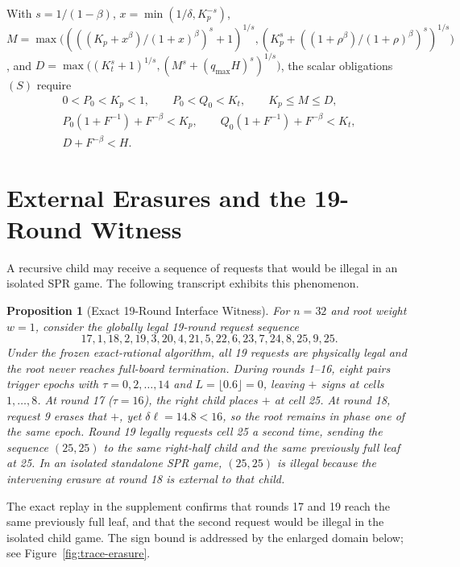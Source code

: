 \documentclass[11pt,letterpaper]{article}
\newtheorem{proposition}[theorem]{Proposition}
\theoremstyle{definition}
\theoremstyle{remark}
\begin{document}
With $s = 1/(1-\beta)$, $x = \min(1/\delta, K_p^{-s})$, $M = \max\bigl((((K_p+x^\beta)/(1+x)^\beta)^s+1)^{1/s}, (K_p^s + ((1+\rho^\beta)/(1+\rho)^\beta)^s)^{1/s}\bigr)$, and $D = \max\bigl((K_t^s+1)^{1/s}, (M^s + (q_{\max}H)^s)^{1/s}\bigr)$, the scalar obligations $(S)$ require
\begin{equation}\label{eq:oblig-S}
\begin{gathered}
  0 < P_0 < K_p < 1, \qquad P_0 < Q_0 < K_t, \qquad K_p \le M \le D,\\
  P_0(1+F^{-1}) + F^{-\beta} < K_p,\qquad
  Q_0(1+F^{-1}) + F^{-\beta} < K_t,\\
  D + F^{-\beta} < H.
\end{gathered}
\end{equation}

\section{External Erasures and the 19-Round Witness}\label{sec:erratum}
A recursive child may receive a sequence of requests that would be illegal in an isolated SPR game. The following transcript exhibits this phenomenon.

\begin{proposition}[Exact 19-Round Interface Witness]\label{prop:19round}
For $n=32$ and root weight $w=1$, consider the globally legal 19-round request sequence
\[
  17, 1, 18, 2, 19, 3, 20, 4, 21, 5, 22, 6, 23, 7, 24, 8, 25, 9, 25.
\]
Under the frozen exact-rational algorithm, all 19 requests are physically legal and the root never reaches full-board termination. During rounds 1--16, eight pairs trigger epochs with $\tau = 0,2,\dots,14$ and $L=\lfloor 0.6\rfloor=0$, leaving $+$ signs at cells $1,\dots,8$. At round 17 ($\tau=16$), the right child places $+$ at cell 25. At round 18, request 9 erases that $+$, yet $\delta \ell = 14.8 < 16$, so the root remains in phase one of the same epoch. Round 19 legally requests cell 25 a second time, sending the sequence $(25,25)$ to the \emph{same} right-half child and the \emph{same} previously full leaf at 25. In an isolated standalone SPR game, $(25,25)$ is illegal because the intervening erasure at round 18 is external to that child.
\end{proposition}

The exact replay in the supplement confirms that rounds 17 and 19 reach the same previously full leaf, and that the second request would be illegal in the isolated child game.  The sign bound is addressed by the enlarged domain below; see Figure~\ref{fig:trace-erasure}.
\end{document}
